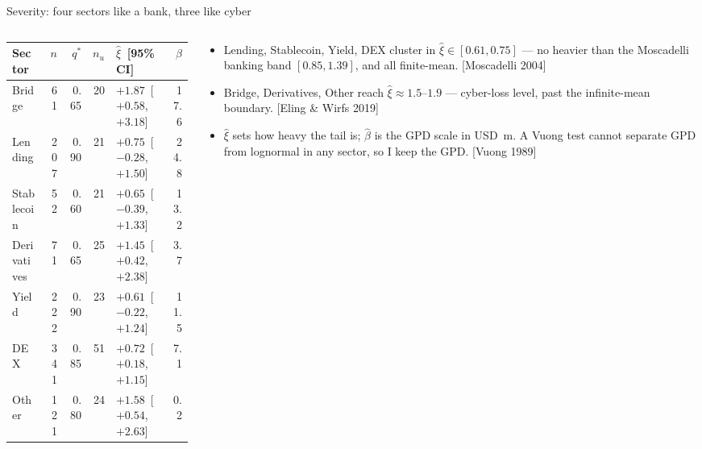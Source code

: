 \documentclass[10pt,xcolor=x11names,aspectratio=169]{beamer}
\newcommand{\src}[1]{[#1]}
\begin{document}
\begin{frame}{Severity: four sectors like a bank, three like cyber}
  \begin{columns}[T]
    \begin{column}{0.56\textwidth}
      \small\setlength{\tabcolsep}{3pt}
      \begin{tabular}{lrrrlr}
        \toprule
        Sector & $n$ & $q^*$ & $n_u$ & $\hat\xi$ \,[95\% CI] & $\hat\beta$ \\
        \midrule
        Bridge      &  61 & 0.65 & 20 & $+1.87$ \,[$+0.58$, $+3.18$] & 17.6 \\
        Lending     & 207 & 0.90 & 21 & $+0.75$ \,[$-0.28$, $+1.50$] & 24.8 \\
        Stablecoin  &  52 & 0.60 & 21 & $+0.65$ \,[$-0.39$, $+1.33$] & 13.2 \\
        Derivatives &  71 & 0.65 & 25 & $+1.45$ \,[$+0.42$, $+2.38$] &  3.7 \\
        Yield       & 222 & 0.90 & 23 & $+0.61$ \,[$-0.22$, $+1.24$] & 11.5 \\
        DEX         & 341 & 0.85 & 51 & $+0.72$ \,[$+0.18$, $+1.15$] &  7.1 \\
        Other       & 121 & 0.80 & 24 & $+1.58$ \,[$+0.54$, $+2.63$] &  0.2 \\
        \bottomrule
      \end{tabular}
    \end{column}
    \begin{column}{0.41\textwidth}
      \small
      \begin{itemize}
        \item Lending, Stablecoin, Yield, DEX cluster in
              $\hat\xi \in [0.61, 0.75]$ --- no heavier than the Moscadelli
              banking band $[0.85, 1.39]$, and all finite-mean.
              \src{Moscadelli 2004}
        \item Bridge, Derivatives, Other reach $\hat\xi \approx 1.5$--$1.9$ ---
              cyber-loss level, past the infinite-mean boundary.
              \src{Eling \& Wirfs 2019}
        \item $\hat\xi$ sets how heavy the tail is; $\hat\beta$ is the GPD
              scale in USD~m. A Vuong test cannot separate GPD from lognormal
              in any sector, so I keep the GPD. \src{Vuong 1989}
      \end{itemize}
    \end{column}
  \end{columns}
\end{frame}
\end{document}
